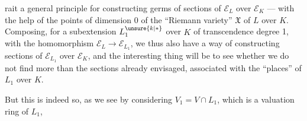 
rait a general principle for constructing germs of sections of $\mathcal E_L$ over $\mathcal E_K$ --- with the help of the points of dimension 0 of the ``Riemann variety'' $\mathfrak X$ of $L$ over $K$. Composing, for a subextension $L_1^{\unsure{k|*}}$ over $K$ of transcendence degree 1, with the homomorphism $\mathcal E_L\longrightarrow\mathcal E_{L_1}$, we thus also have a way of constructing  sections of $\mathcal E_{L_1}$ over $\mathcal E_K$, and the interesting thing will be to see whether we do not find more  than the sections already envisaged, associated with the ``places'' of $L_1$ over $K$.

But this is indeed so, as we see by considering $V_1=V\cap L_1$, which is a valuation ring of $L_1$,
